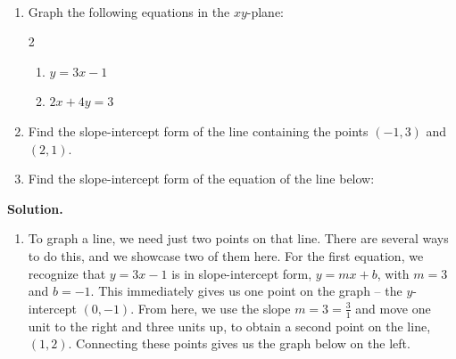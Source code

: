 \documentclass{ximera}
\begin{document}
\begin{example}  $~$

\begin{enumerate}

\item Graph the following equations in the $xy$-plane:

\begin{multicols}{2}
\begin{enumerate}

\item  $y = 3x - 1$

\item  $2x + 4y = 3$

\end{enumerate}
\end{multicols}

\item  Find the slope-intercept form of the line containing the points $(-1,3)$ and $(2,1)$.

\item  Find the slope-intercept form of the equation of the line below:

\begin{center}
\end{center}

\end{enumerate}

 

{\bf Solution.}  

\begin{enumerate}

\item To graph a line, we need just two points on that line.  There are several ways to do this, and we showcase two of them here.  For the first equation, we recognize that $y = 3x-1$ is in slope-intercept form, $y = mx+b$, with $m = 3$ and $b = -1$.  This immediately gives us one point on the graph -- the $y$-intercept $(0,-1)$. From here, we use the slope $m = 3 = \frac{3}{1}$ and move one unit to the right and three units up, to obtain a second point on the line, $(1,2)$.  Connecting these points gives us the graph below on the left.  


\end{enumerate}
\end{example}
\end{document}
